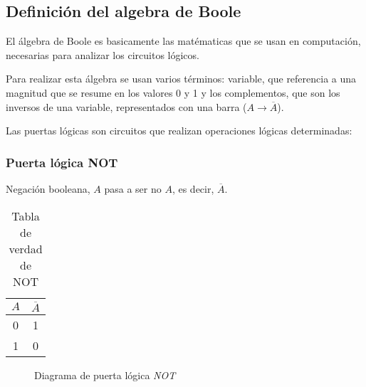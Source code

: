 \documentclass[12pt]{article}
\begin{document}
    \subsection{Definición del algebra de Boole \cite{floyd_fundamentos_2006} \cite{logic_gate} \cite{puerta_logica}}
        El álgebra de Boole es basicamente las matématicas que se usan en computación, necesarias para analizar los circuitos lógicos. 

        Para realizar esta álgebra se usan varios términos: variable, que referencia a una magnitud que se resume en los valores 0 y 1 y los complementos, que son los inversos de una variable, representados con una barra ($A \rightarrow \overline{A}$). 

        Las puertas lógicas son circuitos que realizan operaciones lógicas determinadas: 
        
            \subsubsection{\textbf{Puerta lógica NOT}}
            
            Negación booleana, $A$ pasa a ser no $A$, es decir, $\overline{A}$.

                \begin{multicols}{2}

\begin{table}[H]
    \centering
                        \begin{tabular}{|c|c|}
                            $A$ & $\overline{A}$ \\
                            \hline
                            0 & 1 \\
                            1 & 0
                        \end{tabular}
    \caption{Tabla de verdad de NOT}
    \label{tab:not}
\end{table}
                           
                    \columnbreak
                    \newpage
                    \begin{figure}[H]
                        \centering
                        
                        \caption{Diagrama de puerta lógica \textit{NOT} \cite{logic_gate}}
                        \label{fig:not}
                    \end{figure}
                \end{multicols}
                
\end{document}
